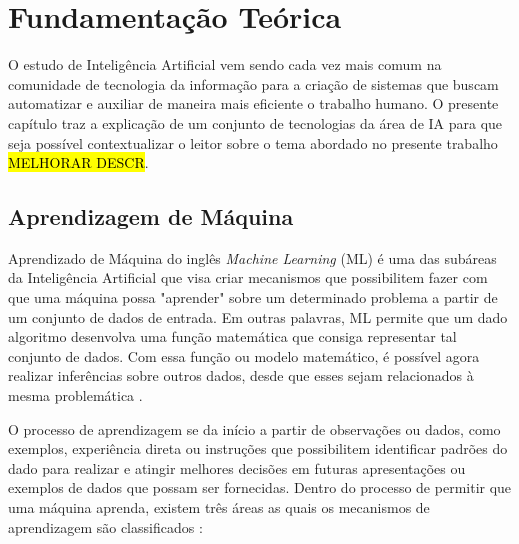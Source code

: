 \chapter[Fundamentação Teórica]{Fundamentação Teórica}

O estudo de Inteligência Artificial vem sendo cada vez mais comum na comunidade de tecnologia da informação para a criação de sistemas que buscam automatizar e auxiliar de maneira mais eficiente o trabalho humano. O presente capítulo traz a explicação de um conjunto de tecnologias da área de IA para que seja possível contextualizar o leitor sobre o tema abordado no presente trabalho \hl{MELHORAR DESCR}.

\section{Aprendizagem de Máquina}

Aprendizado de Máquina do inglês \textit{Machine Learning} (ML) é uma das subáreas da Inteligência Artificial que visa criar mecanismos que possibilitem fazer com que uma máquina possa "aprender" sobre um determinado problema a partir de um conjunto de dados de entrada. Em outras palavras, ML permite que um dado algoritmo desenvolva uma função matemática que consiga representar tal conjunto de dados. Com essa função ou modelo matemático, é possível agora realizar inferências sobre outros dados, desde que esses sejam relacionados à mesma problemática \cite{deep-learning-book-br}.

O processo de aprendizagem se da início a partir de observações ou dados, como exemplos, experiência direta ou instruções que possibilitem identificar padrões do dado para realizar e atingir melhores decisões em futuras apresentações ou exemplos de dados que possam ser fornecidas. Dentro do processo de permitir que uma máquina aprenda, existem três áreas as quais os mecanismos de aprendizagem são classificados \cite{python-ml}:

